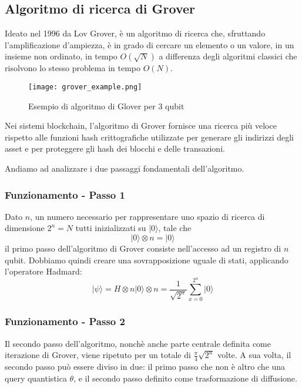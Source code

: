 \subsection{Algoritmo di ricerca di Grover}
Ideato nel 1996 da Lov Grover, è un algoritmo di ricerca che, sfruttando l'amplificazione d'ampiezza, è in grado di cercare un elemento o un valore, in un insieme non ordinato, in tempo \(O\left(\sqrt{N}\right)\) a differenza degli algoritmi classici che risolvono lo stesso problema in tempo \(O\left(N\right)\).

\begin{figure}[h]
  \centering
  \texttt{[image: grover\_example.png]}
  \caption{Esempio di algoritmo di Glover per 3 qubit}
  \label{fig:grover_example}
\end{figure}

Nei sistemi blockchain, l'algoritmo di Grover fornisce una ricerca più veloce rispetto alle funzioni hash crittografiche utilizzate per generare gli indirizzi degli asset e per proteggere gli hash dei blocchi e delle transazioni.

Andiamo ad analizzare i due passaggi fondamentali dell'algoritmo.
\subsubsection{Funzionamento - Passo 1}
Dato \(n\), un numero necessario per rappresentare uno spazio di ricerca di dimensione \(2^n = N\) tutti inizializzati su \(|0\rangle\), tale che
\[ |0\rangle \otimes n = |0\rangle \]
il primo passo dell'algoritmo di Grover consiste nell'accesso ad un registro di \(n\) qubit. Dobbiamo quindi creare una sovrapposizione uguale di stati, applicando l'operatore Hadmard:
\[ |\psi\rangle = H \otimes n |0\rangle \otimes n = \frac{1}{\sqrt{2^n}} \sum_{x=0}^{2^n} |0\rangle \]

\subsubsection{Funzionamento - Passo 2}
Il secondo passo dell'algoritmo, nonchè anche parte centrale definita come iterazione di Grover, viene ripetuto per un totale di \( \frac{\pi}{4}\sqrt{2^n} \) volte. A sua volta, il secondo passo può essere diviso in due: il primo passo che non è altro che una query quantistica \(\theta\), e il secondo passo definito come trasformazione di diffusione.

